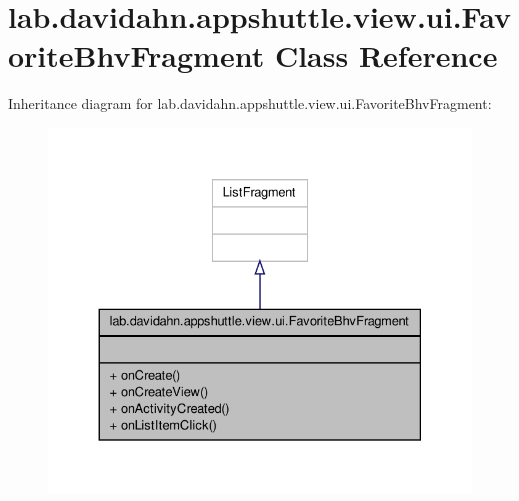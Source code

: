 \hypertarget{classlab_1_1davidahn_1_1appshuttle_1_1view_1_1ui_1_1_favorite_bhv_fragment}{\section{lab.\-davidahn.\-appshuttle.\-view.\-ui.\-Favorite\-Bhv\-Fragment \-Class \-Reference}
\label{classlab_1_1davidahn_1_1appshuttle_1_1view_1_1ui_1_1_favorite_bhv_fragment}
}


\-Inheritance diagram for lab.\-davidahn.\-appshuttle.\-view.\-ui.\-Favorite\-Bhv\-Fragment\-:
\nopagebreak
\begin{figure}[H]
\begin{center}
\leavevmode
\includegraphics[width=330pt]{classlab_1_1davidahn_1_1appshuttle_1_1view_1_1ui_1_1_favorite_bhv_fragment__inherit__graph}
\end{center}
\end{figure}


